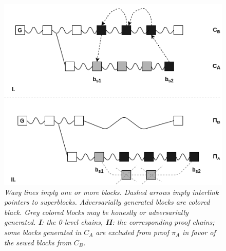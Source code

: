 \documentclass[11pt,a4paper]{article}
\begin{document}
\begin{figure}[h!]
	\begin{center}
		\includegraphics[scale=0.5]{figures/exclude.png}
	\end{center}
	\caption{\textit{ Wavy lines imply one or more blocks. Dashed arrows imply interlink pointers to superblocks. Adversarially generated blocks are colored black. Grey colored blocks may be honestly or adversarially generated. \textbf{I}: the 0-level chains, \textbf{II}: the corresponding proof chains; some blocks generated in $C_A$ are excluded from proof $\pi_A$ in favor of the sewed blocks from $C_B$.}}
	\label{fig:exclude}
\end{figure}
%
\end{document}
